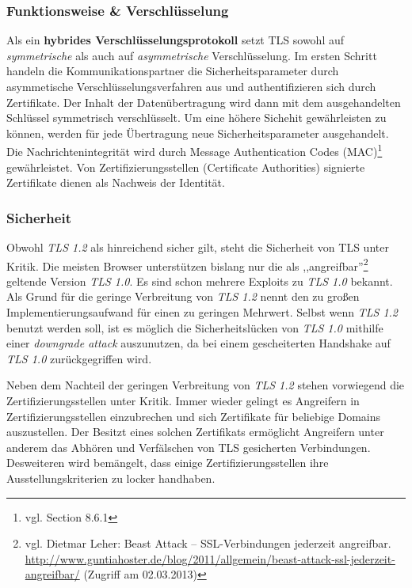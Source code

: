 \documentclass[12pt,a4paper,pointednumbers,abstracton]{scrartcl}
\begin{document}
\subsubsection{Funktionsweise \& Verschlüsselung}

Als ein \textbf{hybrides Verschlüsselungsprotokoll} setzt TLS sowohl auf \emph{symmetrische} als auch auf \emph{asymmetrische} Verschlüsselung.
Im ersten Schritt handeln die Kommunikationspartner die Sicherheitsparameter durch asymmetische Verschlüsselungsverfahren aus und authentifizieren sich durch Zertifikate.
Der Inhalt der Datenübertragung wird dann mit dem ausgehandelten Schlüssel symmetrisch verschlüsselt.
Um eine höhere Sichehit gewährleisten zu können, werden für jede Übertragung neue Sicherheitsparameter ausgehandelt.
Die Nachrichtenintegrität wird durch Message Authentication Codes (MAC)\footnote{vgl. \cite{TanWet2010} Section 8.6.1} gewährleistet.
Von Zertifizierungsstellen (Certificate Authorities) signierte Zertifikate dienen als Nachweis der Identität.

\subsubsection{Sicherheit}
\label{sec:basics-security}

Obwohl \emph{TLS 1.2} als hinreichend sicher gilt, steht die Sicherheit von TLS unter Kritik.
Die meisten Browser unterstützen bislang nur die als ,,angreifbar''\footnote{vgl. Dietmar Leher: Beast Attack – SSL-Verbindungen jederzeit angreifbar. \url{http://www.guntiahoster.de/blog/2011/allgemein/beast-attack-ssl-jederzeit-angreifbar/} (Zugriff am 02.03.2013)} geltende Version \emph{TLS 1.0}.
Es sind schon mehrere Exploits zu \emph{TLS 1.0} bekannt.
Als Grund für die geringe Verbreitung von \emph{TLS 1.2} nennt \cite{Ritter2012} den zu großen Implementierungsaufwand für einen zu geringen Mehrwert.
Selbst wenn \emph{TLS 1.2} benutzt werden soll, ist es möglich die Sicherheitslücken von \emph{TLS 1.0} mithilfe einer \emph{downgrade attack} auszunutzen, da bei einem gescheiterten Handshake auf \emph{TLS 1.0} zurückgegriffen wird.

Neben dem Nachteil der geringen Verbreitung von \emph{TLS 1.2} stehen vorwiegend die Zertifizierungsstellen unter Kritik.
Immer wieder gelingt es Angreifern in Zertifizierungsstellen einzubrechen und sich Zertifikate für beliebige Domains auszustellen.
Der Besitzt eines solchen Zertifikats ermöglicht Angreifern unter anderem das Abhören und Verfälschen von TLS gesicherten Verbindungen.
Desweiteren wird bemängelt, dass einige Zertifizierungsstellen ihre Ausstellungskriterien zu locker handhaben.
\end{document}
